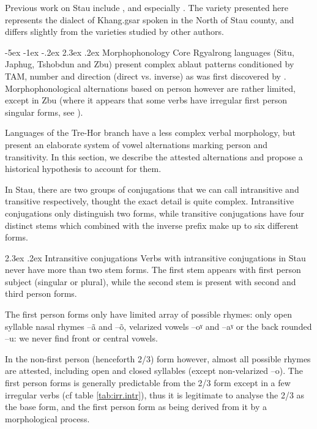\documentclass[oldfontcommands,twoside,12pt]{memoir}
\makeatletter
\newcommand{\ipa}[1]{{\phon #1}} %
\renewcommand\section{\@startsection{section}{0}{\z@}%
                                   {-5ex \@plus -1ex \@minus -.2ex}%
                                   {2.3ex \@plus.2ex}%
                                   {\flushleft\large\bfseries}}
\renewcommand{\subsection}{\@startsection{subsection}{1}{\z@}
                                   {-2.5ex \@plus -1ex \@minus -.2ex}%
                                   {2.3ex \@plus.2ex}%
								{\flushleft\large\itshape} }
\makeatother
\begin{document}
Previous work on Stau include \citet{huangbf91daofu}, \citet{jackson07shangzhai} and especially \citet{sun13gexi}. The variety presented here represents the dialect of Khang.gsar spoken in the North of Stau county, and differs slightly from the varieties studied by other authors.
 
\section{Morphophonology}
Core Rgyalrong languages (Situ, Japhug, Tshobdun and Zbu) present complex ablaut patterns conditioned by TAM, number and direction (direct vs. inverse) as was first discovered by  \citet{jackson00sidaba}.  Morphophonological alternations based on person however are rather limited, except in Zbu (where it appears that some verbs have irregular first person singular forms, see \citealt{gongxun14agreement}).

Languages of the Tre-Hor branch   have a less complex verbal morphology, but present an elaborate system of vowel alternations marking person and transitivity. In this section, we describe the attested alternations and propose a historical hypothesis to account for them.

In Stau, there are two groups of conjugations that we can call intransitive and transitive respectively, thought the exact detail is quite complex. Intransitive conjugations only distinguish two forms, while transitive conjugations have four distinct stems which combined with the inverse prefix make up to six different forms.
 
\subsection{Intransitive conjugations}
Verbs with intransitive conjugations in Stau never have more than two stem forms. The first stem appears with first person subject (singular or plural), while the second stem is present with second and third person forms.

The first person forms only have limited array of possible rhymes: only open syllable nasal rhymes --\ipa{ã} and --\ipa{õ}, velarized vowels --\ipa{oˠ} and --\ipa{aˠ} or the back rounded --\ipa{u}: we never find front or central vowels.

In the non-first person  (henceforth 2/3)  form however, almost all possible rhymes are attested, including open and closed syllables (except non-velarized --\ipa{o}). The first person forms is generally predictable from the 2/3 form except in a few irregular verbs (cf table \ref{tab:irr.intr}), thus it is legitimate to analyse the 2/3 as the base form, and the first person form as being derived from it by a morphological process.
 
\end{document}
